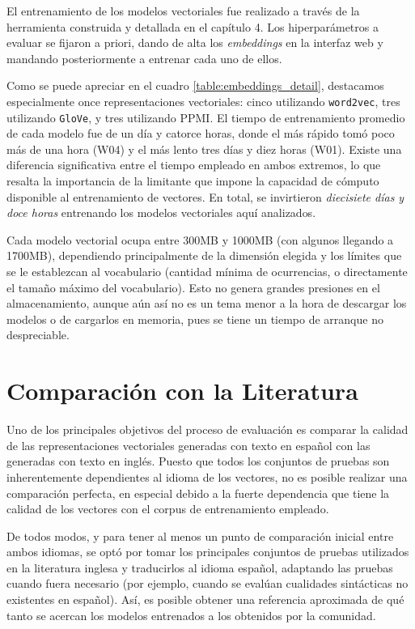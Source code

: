 El entrenamiento de los modelos vectoriales fue realizado a través de la herramienta construida y
detallada en el capítulo 4. Los hiperparámetros a evaluar se fijaron a priori, dando de alta los
\textit{embeddings} en la interfaz web y mandando posteriormente a entrenar cada uno de ellos.

Como se puede apreciar en el cuadro \ref{table:embeddings_detail}, destacamos especialmente once
representaciones vectoriales: cinco utilizando \texttt{word2vec}, tres utilizando \texttt{GloVe}, y
tres utilizando PPMI\@. El tiempo de entrenamiento promedio de cada modelo fue de un día y catorce
horas, donde el más rápido tomó poco más de una hora (W04) y el más lento tres días y diez horas
(W01). Existe una diferencia significativa entre el tiempo empleado en ambos extremos, lo que
resalta la importancia de la limitante que impone la capacidad de cómputo disponible al
entrenamiento de vectores. En total, se invirtieron \textit{diecisiete días y doce horas} entrenando
los modelos vectoriales aquí analizados.

Cada modelo vectorial ocupa entre 300MB y 1000MB (con algunos llegando a 1700MB), dependiendo
principalmente de la dimensión elegida y los límites que se le establezcan al vocabulario (cantidad
mínima de ocurrencias, o directamente el tamaño máximo del vocabulario). Esto no genera grandes
presiones en el almacenamiento, aunque aún así no es un tema menor a la hora de descargar los
modelos o de cargarlos en memoria, pues se tiene un tiempo de arranque no despreciable.


\section{Comparación con la Literatura}

Uno de los principales objetivos del proceso de evaluación es comparar la calidad de las
representaciones vectoriales generadas con texto en español con las generadas con texto en
inglés. Puesto que todos los conjuntos de pruebas son inherentemente dependientes al idioma de los
vectores, no es posible realizar una comparación perfecta, en especial debido a la fuerte
dependencia que tiene la calidad de los vectores con el corpus de entrenamiento empleado.

De todos modos, y para tener al menos un punto de comparación inicial entre ambos idiomas, se optó
por tomar los principales conjuntos de pruebas utilizados en la literatura inglesa y traducirlos al
idioma español, adaptando las pruebas cuando fuera necesario (por ejemplo, cuando se evalúan
cualidades sintácticas no existentes en español). Así, es posible obtener una referencia aproximada
de qué tanto se acercan los modelos entrenados a los obtenidos por la comunidad.

